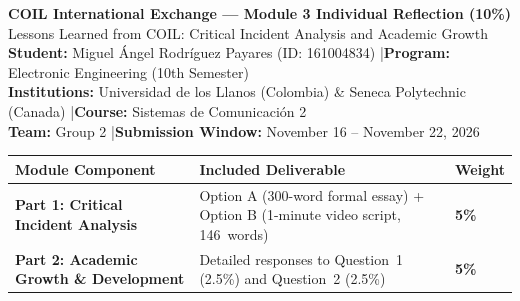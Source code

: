 \documentclass[11pt,letterpaper]{article}
\begin{document}
\thispagestyle{plain}
\begin{tcolorbox}[
    enhanced,
    colback=NavyPrimary,
    colframe=NavyPrimary,
    arc=4pt,
    left=12pt,
    right=12pt,
    top=9pt,
    bottom=9pt
]
{\color{white}\large\bfseries COIL International Exchange --- Module 3 Individual Reflection (10\%)}\\[2pt]
{\color{BorderGray}\small Lessons Learned from COIL: Critical Incident Analysis and Academic Growth}\\[6pt]
{\color{white}\footnotesize
\textbf{Student:} Miguel \'Angel Rodr\'iguez Payares (ID: 161004834) \quad|\quad \textbf{Program:} Electronic Engineering (10th Semester)\\
\textbf{Institutions:} Universidad de los Llanos (Colombia) \& Seneca Polytechnic (Canada) \quad|\quad \textbf{Course:} Sistemas de Comunicaci\'on 2\\
\textbf{Team:} Group 2 \quad|\quad \textbf{Submission Window:} November 16 -- November 22, 2026
}
\end{tcolorbox}

\vspace{0.1cm}

\begin{table}[H]
\centering
\small
\begin{tabularx}{\textwidth}{@{} >{\bfseries}l >{\raggedright\arraybackslash}X >{\bfseries}l @{}}
\toprule
\textbf{Module Component} & \textbf{Included Deliverable} & \textbf{Weight} \\
\midrule
Part 1: Critical Incident Analysis & Option A (300-word formal essay) + Option B (1-minute video script, 146~words) & 5\% \\
Part 2: Academic Growth \& Development & Detailed responses to Question~1 (2.5\%) and Question~2 (2.5\%) & 5\% \\
\bottomrule
\end{tabularx}
\end{table}




\end{document}
